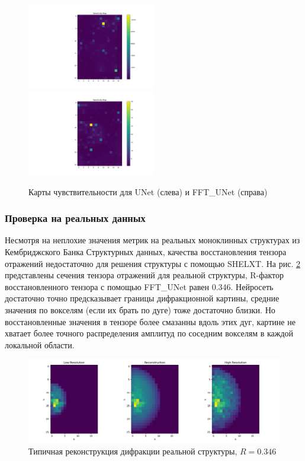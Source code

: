 \documentclass[a4paper,12pt]{article}
\begin{document}
{\begin{figure}[H]
    \centering
    \includegraphics[width=0.5\textwidth]{sensitivity_map.png}\hfill
    \includegraphics[width=0.5\textwidth]{sensitivity_map_fft.png}
    \caption{Карты чувствительности для UNet (слева) и FFT\_UNet (справа)}
    \label{sens}
\end{figure}





\subsubsection*{Проверка на реальных данных}

Несмотря на неплохие значения метрик на реальных моноклинных структурах из Кембриджского Банка Структурных данных, качества восстановления тензора отражений недостаточно для решения структуры с помощью SHELXT. На рис. \ref{recon_ex} представлены сечения тензора отражений для реальной структуры, R-фактор восстановленного тензора с помощью FFT\_UNet равен 0.346. Нейросеть достаточно точно предсказывает границы дифракционной картины, средние значения по вокселям (если их брать по дуге) тоже достаточно близки. Но восстановленные значения в тензоре более смазанны вдоль этих дуг, картине не хватает более точного распределения амплитуд по соседним вокселям в каждой локальной области. 

\begin{figure}[H]
    \centering
    \includegraphics[width=1\textwidth]{recon_example.png}
    \caption{Типичная реконструкция дифракции реальной структуры, $R = 0.346$}
    \label{recon_ex}
\end{figure}

}
\end{document}
